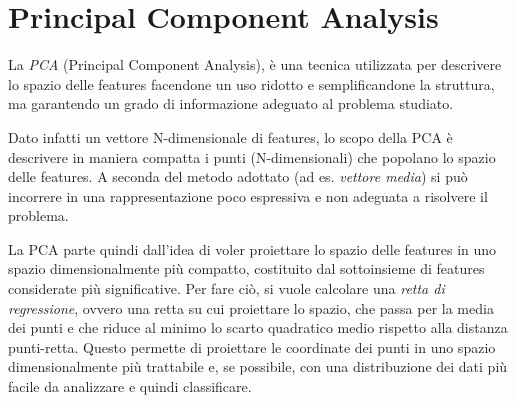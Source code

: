 \documentclass[a4paper,oneside,titlepage]{book}
\begin{document}
\section{Principal Component Analysis}
La \textit{PCA} (Principal Component Analysis), è una tecnica utilizzata per descrivere lo spazio delle features facendone un uso ridotto e semplificandone la struttura, ma garantendo un grado di informazione adeguato al problema studiato.

Dato infatti un vettore N-dimensionale di features, lo scopo della PCA è descrivere in maniera compatta i punti (N-dimensionali) che popolano lo spazio delle features. A seconda del metodo adottato (ad es. \textit{vettore media}) si può incorrere in una rappresentazione poco espressiva e non adeguata a risolvere il problema.

La PCA parte quindi dall'idea di voler proiettare lo spazio delle features in uno spazio dimensionalmente più compatto, costituito dal sottoinsieme di features considerate più significative. Per fare ciò, si vuole calcolare una \textit{retta di regressione}, ovvero una retta su cui proiettare lo spazio, che passa per la media dei punti e che riduce al minimo lo scarto quadratico medio rispetto alla distanza punti-retta. Questo permette di proiettare le coordinate dei punti in uno spazio dimensionalmente più trattabile e, se possibile, con una distribuzione dei dati più facile da analizzare e quindi classificare.
\end{document}
